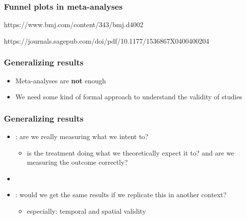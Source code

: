 \documentclass[aspectratio=43]{beamer}
\begin{document}






\begin{frame}
\frametitle{Funnel plots in meta-analyses}
\centering

https://www.bmj.com/content/343/bmj.d4002

https://journals.sagepub.com/doi/pdf/10.1177/1536867X0400400204

\end{frame}
  

\begin{frame}
\frametitle{Generalizing results}
\centering

\begin{itemize}
  \item Meta-analyses are \textbf{not} enough
  \item We need some kind of formal approach to understand the validity of studies
\end{itemize}

\end{frame}

\begin{frame}
\frametitle{Generalizing results}
\centering

\begin{itemize}
  \item {}: are we really measuring what we intent to?
  \begin{itemize}
    \item is the treatment doing what we theoretically expect it to? and are we measuring the outcome correctly?
  \end{itemize}
  \item[]
  \item {}: would we get the same results if we replicate this in another context?
  \begin{itemize}
    \item especially: temporal and spatial validity
  \end{itemize}
\end{itemize}

\end{frame}
\end{document}

